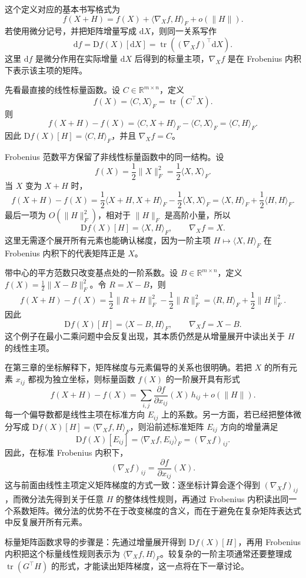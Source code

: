 这个定义对应的基本书写格式为
\[
f(X+H)=f(X)+\langle \nabla_X f,H\rangle_F+o(\|H\|).
\]
若使用微分记号，并把矩阵增量写成 \(\mathrm{d}X\)，则同一关系写作
\[
\mathrm{d}f=\mathrm{D}f(X)[\mathrm{d}X]=\operatorname{tr}((\nabla_X f)^\top \mathrm{d}X).
\]
这里 \(\mathrm{d}f\) 是微分作用在实际增量 \(\mathrm{d}X\) 后得到的标量主项，\(\nabla_X f\) 是在 Frobenius 内积下表示该主项的矩阵。

先看最直接的线性标量函数。设 \(C\in\mathbb{R}^{m\times n}\)，定义
\[
f(X)=\langle C,X\rangle_F=\operatorname{tr}(C^\top X).
\]
则
\[
f(X+H)-f(X)=\langle C,X+H\rangle_F-\langle C,X\rangle_F=\langle C,H\rangle_F.
\]
因此 \(\mathrm{D}f(X)[H]=\langle C,H\rangle_F\)，并且 \(\nabla_X f=C\)。

Frobenius 范数平方保留了非线性标量函数中的同一结构。设
\[
f(X)=\frac12\|X\|_F^2=\frac12\langle X,X\rangle_F.
\]
当 \(X\) 变为 \(X+H\) 时，
\[
f(X+H)-f(X)=\frac12\langle X+H,X+H\rangle_F-\frac12\langle X,X\rangle_F
=\langle X,H\rangle_F+\frac12\langle H,H\rangle_F.
\]
最后一项为 \(O(\|H\|_F^2)\)，相对于 \(\|H\|_F\) 是高阶小量，所以
\[
\mathrm{D}f(X)[H]=\langle X,H\rangle_F,\qquad \nabla_X f=X.
\]
这里无需逐个展开所有元素也能确认梯度，因为一阶主项 \(H\mapsto \langle X,H\rangle_F\) 在 Frobenius 内积下的代表矩阵正是 \(X\)。

带中心的平方范数只改变基点处的一阶系数。设 \(B\in\mathbb{R}^{m\times n}\)，定义 \(f(X)=\frac12\|X-B\|_F^2\)。令 \(R=X-B\)，则
\[
f(X+H)-f(X)=\frac12\|R+H\|_F^2-\frac12\|R\|_F^2
=\langle R,H\rangle_F+\frac12\|H\|_F^2.
\]
因此
\[
\mathrm{D}f(X)[H]=\langle X-B,H\rangle_F,\qquad \nabla_X f=X-B.
\]
这个例子在最小二乘问题中会反复出现，其本质仍然是从增量展开中读出关于 \(H\) 的线性主项。

在第三章的坐标解释下，矩阵梯度与元素偏导的关系也很明确。若把 \(X\) 的所有元素 \(x_{ij}\) 都视为独立坐标，则标量函数 \(f(X)\) 的一阶展开具有形式
\[
f(X+H)-f(X)=\sum_{i,j}\frac{\partial f}{\partial x_{ij}}(X)\,h_{ij}+o(\|H\|).
\]
每一个偏导数都是线性主项在标准方向 \(E_{ij}\) 上的系数。另一方面，若已经把整体微分写成 \(\mathrm{D}f(X)[H]=\langle \nabla_X f,H\rangle_F\)，则沿前述标准矩阵 \(E_{ij}\) 方向的增量满足
\[
\mathrm{D}f(X)[E_{ij}]=\langle \nabla_X f,E_{ij}\rangle_F=(\nabla_X f)_{ij}.
\]
因此，在标准 Frobenius 内积下，
\[
(\nabla_X f)_{ij}=\frac{\partial f}{\partial x_{ij}}(X).
\]
这与前面由线性主项定义矩阵梯度的方式一致：逐坐标计算会逐个得到 \((\nabla_X f)_{ij}\)，而微分法先得到关于任意 \(H\) 的整体线性规则，再通过 Frobenius 内积读出同一个系数矩阵。微分法的优势不在于改变梯度的含义，而在于避免在复杂矩阵表达式中反复展开所有元素。

标量矩阵函数求导的步骤是：先通过增量展开得到 \(\mathrm{D}f(X)[H]\)，再用 Frobenius 内积把这个标量线性规则表示为 \(\langle \nabla_X f,H\rangle_F\)。较复杂的一阶主项通常还要整理成 \(\operatorname{tr}(G^\top H)\) 的形式，才能读出矩阵梯度，这一点将在下一章讨论。

